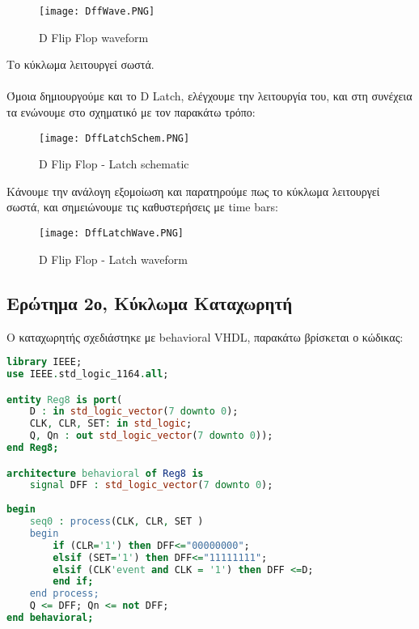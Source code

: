 \documentclass{article}
\begin{document}
\begin{figure}[h!]
  \caption{\foreignlanguage{english}{D Flip Flop waveform}}
\texttt{[image: DffWave.PNG]}
\end{figure}

Το κύκλωμα λειτουργεί σωστά. \\ \\ 

Όμοια δημιουργούμε και το \foreignlanguage{english}{D Latch}, ελέγχουμε την λειτουργία του, και στη συνέχεια τα ενώνουμε στο σχηματικό με τον παρακάτω τρόπο:

\begin{figure}[h!]
  \caption{\foreignlanguage{english}{D Flip Flop - Latch schematic}}
\texttt{[image: DffLatchSchem.PNG]} 
\end{figure}

Κάνουμε την ανάλογη εξομοίωση και παρατηρούμε πως το κύκλωμα λειτουργεί σωστά, και σημειώνουμε τις καθυστερήσεις με \foreignlanguage{english}{time bars}:

\begin{figure}[h!]
  \caption{\foreignlanguage{english}{D Flip Flop - Latch waveform}}
\texttt{[image: DffLatchWave.PNG]}
\end{figure}

\clearpage

\subsection{Ερώτημα 2ο, Κύκλωμα Καταχωρητή}

Ο καταχωρητής σχεδιάστηκε με \foreignlanguage{english}{behavioral VHDL}, παρακάτω βρίσκεται ο κώδικας:

\begin{otherlanguage}{english}
\begin{lstlisting}[language=VHDL, caption= Register with begavioral VHDL]
library IEEE;
use IEEE.std_logic_1164.all;

entity Reg8 is port(
	D : in std_logic_vector(7 downto 0);
	CLK, CLR, SET: in std_logic;
	Q, Qn : out std_logic_vector(7 downto 0));
end Reg8;

architecture behavioral of Reg8 is
	signal DFF : std_logic_vector(7 downto 0);
	
begin
	seq0 : process(CLK, CLR, SET )
	begin
		if (CLR='1') then DFF<="00000000";
		elsif (SET='1') then DFF<="11111111";
		elsif (CLK'event and CLK = '1') then DFF <=D;
		end if;
	end process;
	Q <= DFF; Qn <= not DFF;
end behavioral;
\end{lstlisting}
\end{otherlanguage}
\end{document}
